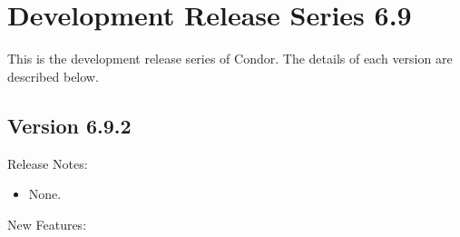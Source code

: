 
\section{\label{sec:History-6-9}Development Release Series 6.9}

This is the development release series of Condor.
The details of each version are described below.

\subsection*{\label{sec:New-6-9-2}Version 6.9.2}

\noindent Release Notes:

\begin{itemize}

\item None.

\end{itemize}


\noindent New Features:

